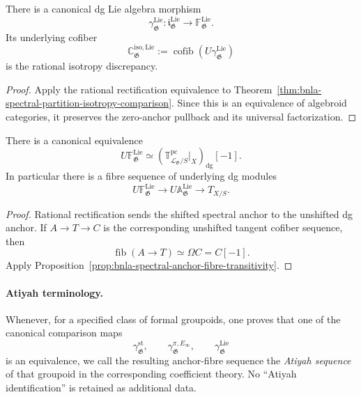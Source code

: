 \begin{corollary}
\label{cor:bnla-dg-isotropy-comparison}
There is a canonical dg Lie algebra morphism
\[
\boxed{
    \gamma^{\mathrm{Lie}}_{\mathfrak G}:
    \mathfrak i^{\mathrm{Lie}}_{\mathfrak G}
    \longrightarrow
    \mathbb F^{\mathrm{Lie}}_{\mathfrak G}.}
\]
Its underlying cofiber
\[
    \mathbb C^{\mathrm{iso},\mathrm{Lie}}_{\mathfrak G}
    :=
    \operatorname{cofib}
    \left(
        U\gamma^{\mathrm{Lie}}_{\mathfrak G}
    \right)
\]
is the rational isotropy discrepancy.
\end{corollary}

\begin{proof}
Apply the rational rectification equivalence to
Theorem~\ref{thm:bnla-spectral-partition-isotropy-comparison}.  Since this is
an equivalence of algebroid categories, it preserves the zero-anchor
pullback and its universal factorization.
\end{proof}

\begin{proposition}
\label{prop:bnla-dg-anchor-transitivity}
There is a canonical equivalence
\[
\boxed{
    U\mathbb F^{\mathrm{Lie}}_{\mathfrak G}
    \simeq
    \left(
        \mathbb T^{\mathrm{pc}}_{\mathcal L_{\mathfrak G}/S}\big|_X
    \right)_{\mathrm{dg}}[-1].}
\]
In particular there is a fibre sequence of underlying dg modules
\[
\boxed{
    U\mathbb F^{\mathrm{Lie}}_{\mathfrak G}
    \longrightarrow
    U\mathbb A^{\mathrm{Lie}}_{\mathfrak G}
    \longrightarrow
    T_{X/S}.}
\]
\end{proposition}

\begin{proof}
Rational rectification sends the shifted spectral anchor to the unshifted dg
anchor.  If $A\to T\to C$ is the corresponding unshifted tangent cofiber
sequence, then
\[
    \operatorname{fib}(A\to T)\simeq\Omega C=C[-1].
\]
Apply Proposition~\ref{prop:bnla-spectral-anchor-fibre-transitivity}.
\end{proof}

\paragraph{Atiyah terminology.}
Whenever, for a specified class of formal groupoids, one proves that one of
the canonical comparison maps
\[
    \gamma^{\mathrm{st}}_{\mathfrak G},
    \qquad
    \gamma^{\pi,E_\infty}_{\mathfrak G},
    \qquad
    \gamma^{\mathrm{Lie}}_{\mathfrak G}
\]
is an equivalence, we call the resulting anchor-fibre sequence the
\emph{Atiyah sequence} of that groupoid in the corresponding coefficient
theory.  No ``Atiyah identification'' is retained as additional data.
